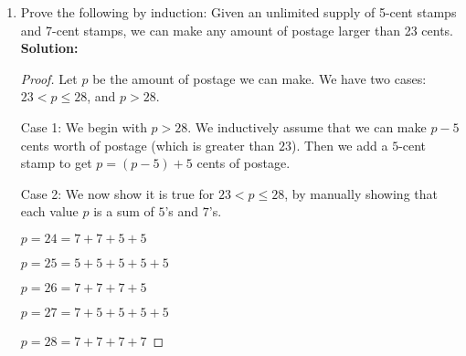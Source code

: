 \documentclass[letterpaper,11pt]{article}
\begin{document}
\begin{enumerate}
\textbf{Solution:}
\begin{proof}
Base case: For $n=0$, then 
\[\sum_{i=0}^{0}c^i = c^0 = 1 = \frac{c-1}{c-1} = \frac{c^1 - 1}{c - 1}.\]

Inductive step: Assume that $\sum_{i=0}^{k-1}c^i = \frac{c^{k} - 1}{c - 1}$. Then,
\begin{align*}
\sum_{i=0}^{k}i &= \sum_{i=0}^{k}c^i\\
                &= \sum_{i=0}^{k-1}c^i + c^k\\
                &= \frac{c^{k} - 1}{c - 1} + c^k & \text{I.H.}\\
                &= \frac{c^{k} - 1}{c - 1} + c^k\frac{c-1}{c-1} \\
                &= \frac{c^{k} - 1}{c - 1} + \frac{c^{k+1}-c^{k}}{c-1} \\
                &= \frac{c^{k+1} + c^k - c^k - 1}{c - 1} \\
                &= \frac{c^{k+1} - 1}{c - 1}.
\end{align*}
\end{proof}
\newpage
\item Prove the following by induction: Given an unlimited supply of 5-cent stamps and 7-cent stamps, we can make any amount of postage larger than 23 cents.\\

\textbf{Solution:}
\begin{proof}
Let $p$ be the amount of postage we can make. We have two cases: $23 < p \leq 28$, and $p > 28$.

Case 1: We begin with $p > 28$.
We inductively assume that we can make $p-5$ cents worth of postage (which is greater than $23$). Then we add a $5$-cent stamp to get $p = (p-5) + 5$ cents of postage.

Case 2: We now show it is true for $23 < p \leq 28$, by manually showing that each value $p$ is a sum of $5$'s and $7$'s. 

$p = 24 = 7 + 7 + 5 + 5$

$p = 25 = 5 + 5 + 5 + 5 + 5$

$p = 26 = 7+7+7+5$

$p = 27 = 7 + 5 + 5 + 5 + 5$

$p = 28 = 7 + 7 + 7 + 7$
\end{proof}
\end{enumerate}
\end{document}

